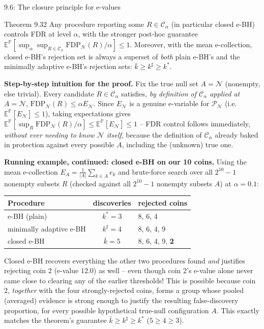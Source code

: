 \documentclass[aspectratio=169,10pt]{beamer}
\newcommand{\Nc}{\mathcal{N}}
\begin{document}
\begin{frame}[allowframebreaks]{9.6: The closure principle for e-values}
\framebreak

\begin{block}{Theorem 9.32}
Any procedure reporting some $R\in\mathcal{C}_\alpha$ (in particular closed e-BH) controls FDR at level $\alpha$, with the stronger post-hoc guarantee $\mathbb{E}^{\mathbb{P}}[\sup_\alpha\sup_{R\in\mathcal{C}_\alpha}\text{FDP}_{\Nc}(R)/\alpha]\le 1$. Moreover, with the mean e-collection, closed e-BH's rejection set is always a superset of \emph{both} plain e-BH's and the minimally adaptive e-BH's rejection sets: $\bar k \ge k^\sharp \ge k^\ast$.
\end{block}

\textbf{Step-by-step intuition for the proof.} Fix the true null set $A=\Nc$ (nonempty, else trivial). Every candidate $R\in\mathcal{C}_\alpha$ satisfies, \emph{by definition of $\mathcal{C}_\alpha$ applied at $A=\Nc$}, $\text{FDP}_{\Nc}(R)\le \alpha E_{\Nc}$. Since $E_\Nc$ is a genuine e-variable for $\mathcal{P}_\Nc$ (i.e. $\mathbb{E}^{\mathbb{P}}[E_\Nc]\le1$), taking expectations gives $\mathbb{E}^{\mathbb{P}}[\sup_R \text{FDP}_\Nc(R)/\alpha] \le \mathbb{E}^{\mathbb{P}}[E_\Nc]\le1$ -- FDR control follows immediately, \emph{without ever needing to know $\Nc$ itself}, because the definition of $\mathcal{C}_\alpha$ already baked in protection against every possible $A$, including the (unknown) true one.

\framebreak

\textbf{Running example, continued: closed e-BH on our 10 coins.} Using the mean e-collection $E_A = \frac1{|A|}\sum_{k\in A}e_k$ and brute-force search over all $2^{10}-1$ nonempty subsets $R$ (checked against all $2^{10}-1$ nonempty subsets $A$) at $\alpha=0.1$:

\begin{center}
\begin{tabular}{lcl}
\toprule
Procedure & discoveries & rejected coins \\
\midrule
e-BH (plain) & $k^\ast=3$ & 8, 6, 4 \\
minimally adaptive e-BH & $k^\sharp=4$ & 8, 6, 4, 9 \\
closed e-BH & $\bar k=5$ & 8, 6, 4, 9, \textbf{2} \\
\bottomrule
\end{tabular}
\end{center}

Closed e-BH recovers everything the other two procedures found \emph{and} justifies rejecting coin 2 (e-value $12.0$) as well -- even though coin 2's e-value alone never came close to clearing any of the earlier thresholds! This is possible because coin 2, \emph{together} with the four strongly-rejected coins, forms a group whose pooled (averaged) evidence is strong enough to justify the resulting false-discovery proportion, for every possible hypothetical true-null configuration $A$. This exactly matches the theorem's guarantee $\bar k\ge k^\sharp\ge k^\ast$ ($5\ge4\ge3$).


\end{frame}
\end{document}
